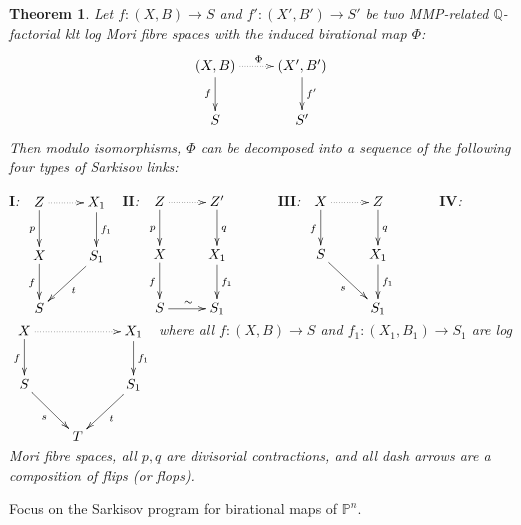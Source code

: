 \documentclass{article}
\newtheorem{thm}[defn]{Theorem}
\begin{document}
\begin{thm}
	Let $ f:(X, B)\to S$ and $f':(X', B')\to S' $ be two MMP-related $ \mathbb{Q} $-factorial klt log Mori fibre spaces with the induced  birational map $\Phi$:
	\[
		\xymatrix{
			(X,B)\ar[d]_f\ar@{.>}[r]^\Phi&(X',B')\ar[d]^{f'}\\
			S&S'}
	\]
	Then modulo isomorphisms, $ \Phi  $ can be decomposed into a sequence of the following four types of Sarkisov links:

	$\textbf{I}$:
	$\xymatrix{
			Z\ar[d]_p\ar@{.>}[r]&X_1\ar[d]^{f_1}\\
			X\ar[d]_f&S_1\ar[dl]^{t}\\
			S &}$
	$\textbf{II}$:
	$\xymatrix{
			Z\ar[d]_p\ar@{.>}[r]&Z'\ar[d]^{q}&\\
			X\ar[d]_{f}&X_1\ar[d]^{f_1}\\
			S\ar[r]^{\sim}&S_1}$
	$\textbf{III}$:
	$
		\xymatrix{
		X\ar@{.>}[r]\ar[d]_f& Z\ar[d]^q& \\
		S\ar[rd]_{s}         & X_{1}\ar[d]^{f_{1}}&\\
		&S_{1}
		}
	$
	$\textbf{IV}$:
	$\xymatrix{
			X\ar[d]_f\ar@{.>}[rr]&&X_1\ar[d]^{f_1}\\
			S\ar[dr]_{s}&&S_1\ar[dl]^{t}\\
			&T &}$
	where all $ f:(X, B)\to S $ and $ f_1:(X_1, B_1)\to S_1 $ are log Mori fibre spaces, all $ p,q $ are divisorial contractions, and all dash arrows are a composition of flips (or flops).
\end{thm}

Focus on the Sarkisov program for birational maps of $\mathbb{P}^{n}$.
\end{document}
